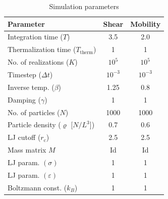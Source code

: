 \documentclass[11pt]{article}
\theoremstyle{definition}
\begin{document}
\begin{table}[h!]
\begin{tabular}{@{}lcc@{}}
	\toprule
	\bf{Parameter} & {\bf Shear} & {\bf Mobility} \\
	\midrule
Integration time ($T$) & 3.5 & 2.0 \\
    Thermalization time ($T_\mathrm{therm}$) & 1 & 1 \\
	No. of realizations ($K$) & $10^5$ & $10^5$ \\
	Timestep ($\Delta t$) & $10^{-3}$ & $10^{-3}$ \\
	Inverse temp. ($\beta$) & 1.25 & 0.8 \\
	Damping ($\gamma$) & 1 & 1 \\
	No. of particles ($N$) & 1000 & 1000 \\
	Particle density ($\varrho$ [$N/L^3$]) & 0.7 & 0.6 \\
	LJ cutoff ($r_\mathrm{c}$) & 2.5 & 2.5 \\
	Mass matrix $M$ & {\rm Id} & {\rm Id} \\
	LJ param. $(\sigma)$ & 1 & 1 \\
	LJ param. $(\varepsilon)$ & 1 & 1 \\
	Boltzmann const. ($k_B$) & 1 & 1 \\
	\bottomrule
\end{tabular}
\caption{Simulation parameters}\label{table:sim_params}%
\end{table}
\end{document}
